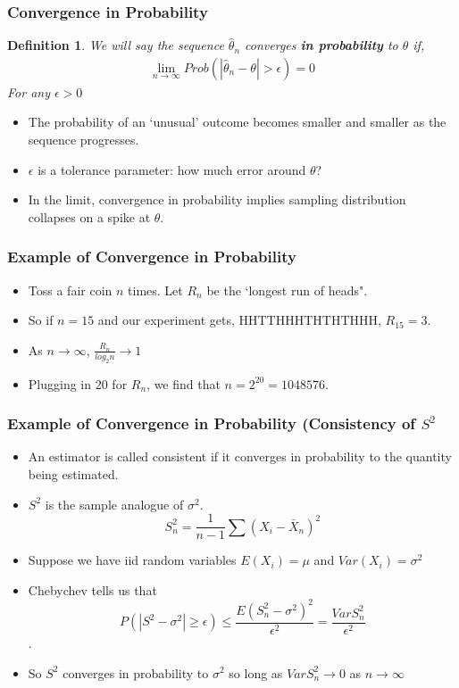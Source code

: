 \documentclass{beamer}
\newtheorem{defn}{Definition}
\numberwithin{equation}{section}
\begin{document}
\begin{frame}
\frametitle{Convergence in Probability}

\pause 
\begin{defn} 
We will say the sequence $\widehat{\theta}_{n}$ converges \textbf{in probability} to $\theta$  if, 
\begin{eqnarray}
\lim_{n\rightarrow\infty} Prob(|\widehat{\theta}_{n} - \theta | > \epsilon ) = 0 \nonumber 
\end{eqnarray}
For any $\epsilon>0$
\end{defn} \pause 

\begin{itemize}
\item The probability of an `unusual' outcome becomes smaller and smaller as the sequence progresses.
\item[-] $\epsilon$ is a tolerance parameter: how much error around $\theta$? \pause 
\item[-] In the limit, convergence in probability implies sampling distribution collapses on a spike at $\theta$. \pause 
\end{itemize}

\end{frame}

\begin{frame}
\frametitle{Example of Convergence in Probability}
\begin{itemize}
\item Toss a fair coin $n$ times.  Let $R_n$ be the `longest run of heads".  
\item So if $n=15$ and our experiment gets, HHTTHHHTHTHTHHH, $R_15=3$.
\item As $n\rightarrow \infty$, $\frac{R_n}{log_2 n}\rightarrow 1$
\item Plugging in 20 for $R_n$, we find that $n=2^{20}=1048576$.
\end{itemize}

\end{frame}


\begin{frame}
\frametitle{Example of Convergence in Probability (Consistency of $S^2$}
\begin{itemize}
\item An estimator is called consistent if it converges in probability to the quantity being estimated.
\item $S^2$ is the sample analogue of $\sigma^2$.
$$S^2_n=\frac{1}{n-1}\sum(X_i-\bar{X}_n)^2$$\pause
\item Suppose we have iid random variables $E(X_i)=\mu$ and $Var(X_i)=\sigma^2$
\item Chebychev tells us that 
$$P(|S^2-\sigma^2|\geq \epsilon)\leq \frac{E(S^2_n-\sigma^2)^2}{\epsilon^2}=\frac{VarS^2_n}{\epsilon^2}$$.
\item So $S^2$ converges in probability to $\sigma^2$ so long as $VarS^2_n\rightarrow 0$ as $n\rightarrow \infty$


\end{itemize}

\end{frame}
\end{document}
